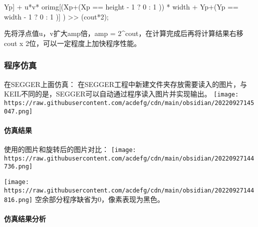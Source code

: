 \documentclass[
]{article}
\newenvironment{Shaded}{}{}
\newcommand{\DecValTok}[1]{\textcolor[rgb]{0.25,0.63,0.44}{#1}}
\newcommand{\NormalTok}[1]{#1}
\newcommand{\OperatorTok}[1]{\textcolor[rgb]{0.40,0.40,0.40}{#1}}
\begin{document}
\begin{Shaded}
\begin{Highlighting}[]
\NormalTok{                             Yp}\OperatorTok{]} \OperatorTok{+} 
\NormalTok{                             u}\OperatorTok{*}\NormalTok{v}\OperatorTok{*}\NormalTok{         orimg}\OperatorTok{[(}\NormalTok{Xp}\OperatorTok{+(}\NormalTok{Xp }\OperatorTok{==}\NormalTok{ height }\OperatorTok{{-}} \DecValTok{1} \OperatorTok{?} \DecValTok{0} \OperatorTok{:} \DecValTok{1} \OperatorTok{))} \OperatorTok{*}\NormalTok{ width }\OperatorTok{+} 
\NormalTok{                             Yp}\OperatorTok{+(}\NormalTok{Yp }\OperatorTok{==}\NormalTok{ width }\OperatorTok{{-}} \DecValTok{1} \OperatorTok{?} \DecValTok{0} \OperatorTok{:} \DecValTok{1} \OperatorTok{)]} \OperatorTok{)} \OperatorTok{\textgreater{}\textgreater{}} \OperatorTok{(}\NormalTok{cout}\OperatorTok{*}\DecValTok{2}\OperatorTok{);}
\end{Highlighting}
\end{Shaded}

先将浮点值u，v扩大amp倍，amp =
2\^{}cout，在计算完成后再将计算结果右移cout x
2位，可以一定程度上加快程序性能。

\hypertarget{ux7a0bux5e8fux4effux771f}{%
\subsubsection{程序仿真}\label{ux7a0bux5e8fux4effux771f}}

在SEGGER上面仿真：
在SEGGER工程中新建文件夹存放需要读入的图片，与KEIL不同的是，SEGGER可以自动通过程序读入图片并实现输出。
\texttt{[image: https://raw.githubusercontent.com/acdefg/cdn/main/obsidian/20220927145047.png]}

\hypertarget{ux4effux771fux7ed3ux679c}{%
\paragraph{仿真结果}\label{ux4effux771fux7ed3ux679c}}

使用的图片和旋转后的图片对比：
\texttt{[image: https://raw.githubusercontent.com/acdefg/cdn/main/obsidian/20220927144736.png]}

\texttt{[image: https://raw.githubusercontent.com/acdefg/cdn/main/obsidian/20220927144816.png]}
空余部分程序缺省为0，像素表现为黑色。

\hypertarget{ux4effux771fux7ed3ux679cux5206ux6790}{%
\paragraph{仿真结果分析}\label{ux4effux771fux7ed3ux679cux5206ux6790}}
\end{document}
